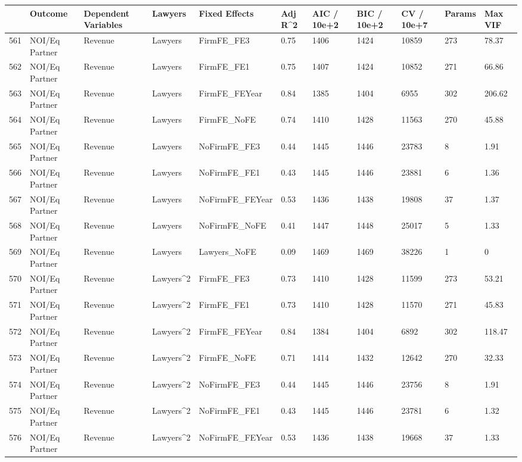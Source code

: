 \begin{table}[ht]
\centering
\begin{tabular}{rllllllllll}
  \hline
 & Outcome & Dependent Variables & Lawyers & Fixed Effects & Adj R^2 & AIC / 10e+2 & BIC / 10e+2 & CV / 10e+7 & Params & Max VIF \\ 
  \hline
561 & NOI/Eq Partner & Revenue & Lawyers & FirmFE\_FE3 & 0.75 & 1406 & 1424 & 10859 & 273 & 78.37 \\ 
  562 & NOI/Eq Partner & Revenue & Lawyers & FirmFE\_FE1 & 0.75 & 1407 & 1424 & 10852 & 271 & 66.86 \\ 
  563 & NOI/Eq Partner & Revenue & Lawyers & FirmFE\_FEYear & 0.84 & 1385 & 1404 & 6955 & 302 & 206.62 \\ 
  564 & NOI/Eq Partner & Revenue & Lawyers & FirmFE\_NoFE & 0.74 & 1410 & 1428 & 11563 & 270 & 45.88 \\ 
  565 & NOI/Eq Partner & Revenue & Lawyers & NoFirmFE\_FE3 & 0.44 & 1445 & 1446 & 23783 & 8 & 1.91 \\ 
  566 & NOI/Eq Partner & Revenue & Lawyers & NoFirmFE\_FE1 & 0.43 & 1445 & 1446 & 23881 & 6 & 1.36 \\ 
  567 & NOI/Eq Partner & Revenue & Lawyers & NoFirmFE\_FEYear & 0.53 & 1436 & 1438 & 19808 & 37 & 1.37 \\ 
  568 & NOI/Eq Partner & Revenue & Lawyers & NoFirmFE\_NoFE & 0.41 & 1447 & 1448 & 25017 & 5 & 1.33 \\ 
  569 & NOI/Eq Partner & Revenue & Lawyers & Lawyers\_NoFE & 0.09 & 1469 & 1469 & 38226 & 1 & 0 \\ 
  570 & NOI/Eq Partner & Revenue & Lawyers^2 & FirmFE\_FE3 & 0.73 & 1410 & 1428 & 11599 & 273 & 53.21 \\ 
  571 & NOI/Eq Partner & Revenue & Lawyers^2 & FirmFE\_FE1 & 0.73 & 1410 & 1428 & 11570 & 271 & 45.83 \\ 
  572 & NOI/Eq Partner & Revenue & Lawyers^2 & FirmFE\_FEYear & 0.84 & 1384 & 1404 & 6892 & 302 & 118.47 \\ 
  573 & NOI/Eq Partner & Revenue & Lawyers^2 & FirmFE\_NoFE & 0.71 & 1414 & 1432 & 12642 & 270 & 32.33 \\ 
  574 & NOI/Eq Partner & Revenue & Lawyers^2 & NoFirmFE\_FE3 & 0.44 & 1445 & 1446 & 23756 & 8 & 1.91 \\ 
  575 & NOI/Eq Partner & Revenue & Lawyers^2 & NoFirmFE\_FE1 & 0.43 & 1445 & 1446 & 23781 & 6 & 1.32 \\ 
  576 & NOI/Eq Partner & Revenue & Lawyers^2 & NoFirmFE\_FEYear & 0.53 & 1436 & 1438 & 19668 & 37 & 1.33 \\ 

\end{tabular}
\end{table}
